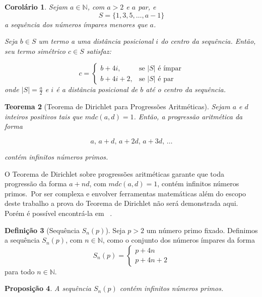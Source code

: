 \documentclass[a4paper,11pt]{article}
\newtheorem{theorem}{Teorema}[section]
\newtheorem{proposition}[theorem]{Proposição}
\newtheorem{corollary}[theorem]{Corolário}
\theoremstyle{definition}
\newtheorem{definition}[theorem]{Definição}
\theoremstyle{remark}
\begin{document}
	\begin{corollary} \label{coro:par_simetrico}
		Sejam $a \in \mathbb{N}$, com $a > 2$ e $a$ par, e
		\[
		S = \{1, 3, 5, \dotsc, a - 1\}
		\]
		a sequência dos números ímpares menores que $a$.
		
		Seja $b \in S$ um termo a uma distância posicional $i$ do centro da sequência. Então, seu termo simétrico $c \in S$ satisfaz:
		
		\[
		c =
		\begin{cases}
			b + 4i, & \text{se } |S| \text{ é ímpar} \\
			b + 4i + 2, & \text{se } |S| \text{ é par}
		\end{cases}
		\]
		onde $|S| = \frac{a}{2}$ e $i$ é a distância posicional de $b$ até o centro da sequência.
	\end{corollary}
	
	
	
	\begin{theorem}[Teorema de Dirichlet para Progressões Aritméticas] \label{teo:dirichlet}
		Sejam $a$ e $d$ inteiros positivos tais que $mdc(a, d) = 1$. Então, a progressão aritmética da forma
		
		\[
		a,\, a + d,\, a + 2d,\, a + 3d,\, \dots
		\]
		
		contém infinitos números primos.
	\end{theorem}
	
	O Teorema de Dirichlet sobre progressões aritméticas garante que toda progressão da forma $a + nd$, com $mdc(a, d) = 1$, contém infinitos números primos.~Por ser complexa e envolver ferramentas matemáticas além do escopo deste trabalho a prova do Teorema de Dirichlet não será demonstrada aqui. Porém é possível encontrá-la em ~\cite{apostol}.  
	
	\begin{definition}[Sequência \(S_n(p)\)]\label{def:snp}
		Seja \(p > 2\) um número primo fixado. Definimos a sequência \(S_n(p)\), com \(n \in \mathbb{N}\), como o conjunto dos números ímpares da forma
		\[
		S_n(p) = 
		\begin{cases}
			p + 4n \\
			p + 4n + 2
		\end{cases}
		\]
		para todo \(n \in \mathbb{N}\).
	\end{definition}
	
	\vspace{0.5cm}
	
	\begin{proposition}
		A sequência \(S_n(p)\) contém infinitos números primos.
	\end{proposition}
	
\end{document}
